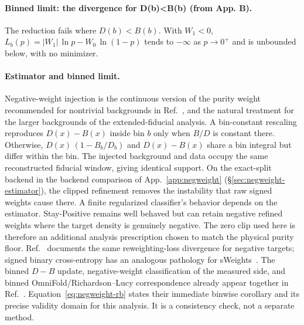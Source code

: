 \paragraph{Binned limit: the divergence for D(b)<B(b) (from App. B).} The reduction fails where $D(b)<B(b)$. With $W_1<0$, $L_b(p)=|W_1|\,\ln p-W_0\,\ln(1-p)$ tends to $-\infty$ as $p\to0^+$ and is unbounded below, with no minimizer.

\paragraph{Estimator and binned limit.} Negative-weight injection is the continuous version of the purity weight recommended for nontrivial backgrounds in Ref.~\cite{Canelli:2025guide}, and the natural treatment for the larger backgrounds of the extended-fiducial analysis. A bin-constant rescaling reproduces $D(x)-B(x)$ inside bin $b$ only when $B/D$ is constant there. Otherwise, $D(x)\,(1-B_{b}/D_{b})$ and $D(x)-B(x)$ share a bin integral but differ within the bin. The injected background and data occupy the same reconstructed fiducial window, giving identical support. On the exact-split backend in the backend comparison of App.~\ref{app:negweight} (\S\ref{sec:negweight-estimator}), the clipped refinement removes the instability that raw signed weights cause there. A finite regularized classifier's behavior depends on the estimator. Stay-Positive remains well behaved but can retain negative refined weights where the target density is genuinely negative. The zero clip used here is therefore an additional analysis prescription chosen to match the physical purity floor. Ref.~\cite{Nachman:2025staypositive} documents the same reweighting-loss divergence for negative targets; signed binary cross-entropy has an analogous pathology for sWeights~\cite{GlazierTyson:2024}. The binned $D-B$ update, negative-weight classification of the measured side, and binned OmniFold/Richardson--Lucy correspondence already appear together in Ref.~\cite{Andreassen:2021zzk}. Equation~\eqref{eq:negweight-rb} states their immediate binwise corollary and its precise validity domain for this analysis. It is a consistency check, not a separate method.

